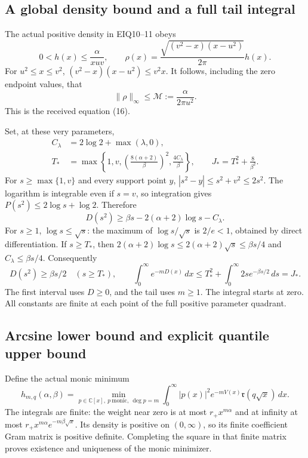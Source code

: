 \documentclass[11pt,a4paper]{article}
\begin{document}
\subsection{A global density bound and a full tail integral}

The actual positive density in EIQ10--11 obeys
\[
 0<h(x)\le\frac\alpha{xuv},\qquad
 \rho(x)=\frac{\sqrt{(v^2-x)(x-u^2)}}{2\pi}h(x).
\]
For $u^2\le x\le v^2$,
$(v^2-x)(x-u^2)\le v^2x$. It follows, including the zero endpoint
values, that
\[
 \boxed{\|\rho\|_\infty\le
 \mathcal M:=\frac\alpha{2\pi u^2}.}
 \tag{GRE17}
\]
This is the received equation (16).

Set, at these very parameters,
\[
 \begin{split}
 C_\lambda&=2\log2+\max(\lambda,0),\\
 T_*&=\max\left\{1,v,
       \left(\frac{8(\alpha+2)}\beta\right)^2,
       \frac{4C_\lambda}\beta\right\},\qquad
 J_*=T_*^2+\frac8{\beta^2}.
 \end{split}\tag{GRE18}
\]
For $s\ge\max\{1,v\}$ and every support point $y$,
$|s^2-y|\le s^2+v^2\le2s^2$. The logarithm is integrable even
if $s=v$, so integration gives $P(s^2)\le2\log s+\log2$. Therefore
\[
 D(s^2)\ge\beta s-2(\alpha+2)\log s-C_\lambda.
\]
For $s\ge1$, $\log s\le\sqrt s$: the maximum of
$\log s/\sqrt s$ is $2/e<1$, obtained by direct differentiation.
If $s\ge T_*$, then
$2(\alpha+2)\log s\le2(\alpha+2)\sqrt s\le\beta s/4$
and $C_\lambda\le\beta s/4$. Consequently
\[
 D(s^2)\ge\beta s/2\quad(s\ge T_*),\qquad
 \int_0^\infty e^{-mD(x)}\,dx
 \le T_*^2+\int_0^\infty2s e^{-\beta s/2}\,ds=J_*.
 \tag{GRE19}
\]
The first interval uses $D\ge0$, and the tail uses $m\ge1$.
The integral starts at zero. All constants are finite at each point
of the full positive parameter quadrant.

\subsection{Arcsine lower bound and explicit quantile upper bound}

Define the actual monic minimum
\[
 h_{m,q}(\alpha,\beta)=
 \min_{p\in\mathbb C[x],\ p\ \text{monic},\ \deg p=m}
 \int_0^\infty |p(x)|^2e^{-mV(x)}
                   \mathfrak r(q\sqrt x)\,dx.
 \tag{GRE20}
\]
The integrals are finite: the weight near zero is at most
$r_+x^{m\alpha}$ and at infinity at most
$r_+x^{m\alpha}e^{-m\beta\sqrt x}$. Its density is positive on
$(0,\infty)$, so its finite coefficient Gram matrix is positive
definite. Completing the square in that finite matrix proves existence
and uniqueness of the monic minimizer.
\end{document}
